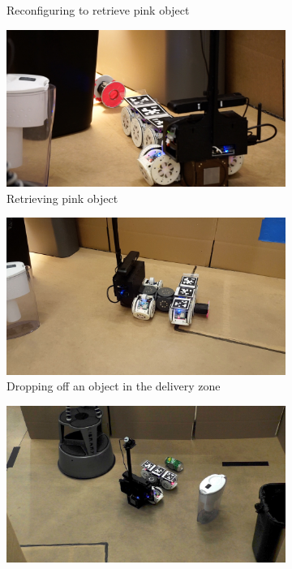 \documentclass[conference]{IEEEtran}
\begin{document}
\begin{figure}[t]
\begin{subfigure}[t]{0.32\textwidth}
        \caption{Reconfiguring to retrieve pink object}
    \end{subfigure}
    \begin{subfigure}[t]{0.32\textwidth}
        \includegraphics[width=\textwidth]{images/pink_retrieval.jpg}
        \caption{Retrieving pink object}
        \label{fig:pink_grab}
    \end{subfigure}
    \begin{subfigure}[t]{0.32\textwidth}
        \includegraphics[width=\textwidth]{images/dropoff.jpg}
        \caption{Dropping off an object in the delivery zone}
        \label{fig:dropoff}
    \end{subfigure}
    \begin{subfigure}[t]{0.32\textwidth}
        \includegraphics[width=\textwidth]{images/green_retrieval.jpg}

\end{subfigure}
\end{figure}
\end{document}
